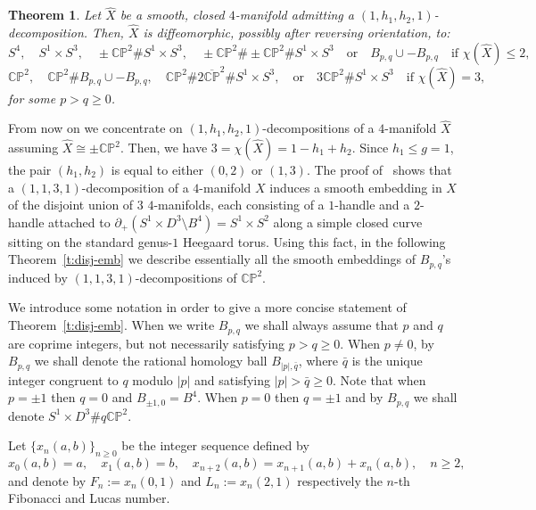 \documentclass[11pt,a4paper]{amsart}
\newcommand{\CP}{\mathbb{CP}}
\newcommand{\x}{\times}
\newcommand{\del}{\partial}
\newtheorem{thm}{Theorem}[section]
\theoremstyle{definition}
\numberwithin{equation}{section}
\begin{document}
\begin{thm}\label{t:type11} 
Let $\hat X$ be a smooth, closed $4$-manifold admitting a $(1,h_1,h_2,1)$-decomposition. 
Then, $\hat X$ is diffeomorphic, possibly after reversing orientation, to: 
\[
S^4,\quad S^1\x S^3,\quad \pm\CP^2\#S^1\x S^3,\quad \pm\CP^2\#\pm\CP^2\#S^1\x S^3
\quad\text{or}\quad B_{p,q}\cup -B_{p,q} \quad\text{if $\chi(\hat X)\leq 2$,}
\]
\[
\CP^2,\quad \CP^2\# B_{p,q}\cup -B_{p,q},\quad \CP^2\# 2\overline{\CP}^2\# S^1\x S^3, 
\quad\text{or}\quad 3\CP^2\#  S^1\x S^3\quad\text{if $\chi(\hat X)=3$,}
\]
for some $p>q\geq 0$.
\end{thm} 
From now on we concentrate on $(1,h_1,h_2,1)$-decompositions of a $4$-manifold $\hat X$ assuming $\hat X\cong\pm\CP^2$. 
Then, we have $3 = \chi(\hat X) = 1 - h_1 + h_2$. 
Since $h_1\leq g=1$, the pair $(h_1,h_2)$ is equal to either $(0,2)$ or $(1,3)$.
The proof of~\cite[Lemma~5.1]{LP22-2} shows that a $(1,1,3,1)$-decomposition of a $4$-manifold $X$ induces a smooth embedding in $X$ of the disjoint union of $3$ $4$-manifolds, each consisting of a $1$-handle and a $2$-handle attached to $\del_+(S^1\x D^3\setminus B^4) = S^1\x S^2$ along a simple closed curve sitting on the standard genus-$1$ Heegaard torus. 
Using this fact, in the following Theorem~\ref{t:disj-emb} we describe essentially all the smooth embeddings of $B_{p,q}$'s induced by $(1,1,3,1)$-decompositions of $\CP^2$.

We introduce some notation in order to give a more concise statement of Theorem~\ref{t:disj-emb}. 
When we write $B_{p,q}$ we shall always assume that $p$ and $q$ are coprime integers, but not necessarily satisfying $p>q\geq 0$. 
When $p\neq 0$, by $B_{p,q}$ we shall denote the rational homology ball $B_{|p|,\bar q}$, where $\bar q$ is the unique integer congruent to $q$ modulo $|p|$ and satisfying $|p|>\bar q\geq 0$. 
Note that when $p=\pm 1$ then $q=0$ and $B_{\pm 1,0} = B^4$. When $p=0$ then $q=\pm 1$ and by $B_{p,q}$ we shall denote $S^1\x D^3\#q\CP^2$. 

Let $\{x_n(a,b)\}_{n\geq 0}$ be the integer sequence defined by 
\[
x_0(a,b)=a,\quad x_1(a,b)=b,\quad x_{n+2}(a,b) = x_{n+1}(a,b) + x_n(a,b),\quad n\geq 2,
\]
and denote by $F_n := x_n(0,1)$ and $L_n := x_n(2,1)$ respectively the $n$-th 
Fibonacci and Lucas number. 
\end{document}
